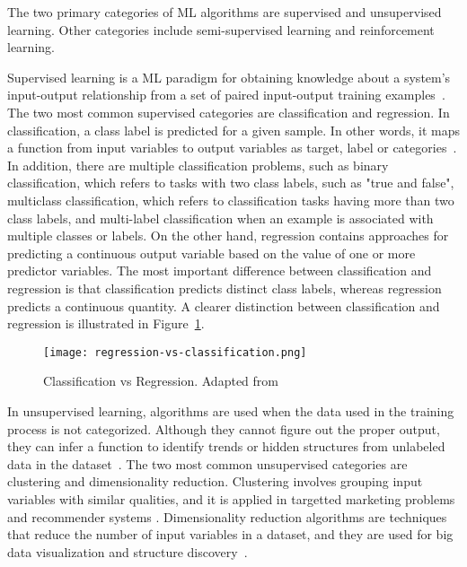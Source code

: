 \begin{enumerate}
    The two primary categories of \gls{ML} algorithms are supervised and unsupervised learning. Other categories include semi-supervised learning and reinforcement learning.
    
    Supervised learning is a \gls{ML} paradigm for obtaining knowledge about a system's input-output relationship from a set of paired input-output training examples~\cite{Liu2012SupervisedLearning}. The two most common supervised categories are classification and regression. In classification, a class label is predicted for a given sample. In other words, it maps a function from input variables to output variables as target, label or categories~\cite{Sarker2021MachineDirections}.
    In addition, there are multiple classification problems, such as binary classification, which refers to tasks with two class labels, such as "true and false", multiclass classification, which refers to classification tasks having more than two class labels, and multi-label classification when an example is associated with multiple classes or labels. On the other hand, regression contains approaches for predicting a continuous output variable based on the value of one or more predictor variables. The most important difference between classification and regression is that classification predicts distinct class labels, whereas regression predicts a continuous quantity. A clearer distinction between classification and regression is illustrated in Figure~\ref{fig:regression_vs_classification}.
        
    \begin{figure}[htbp]
        \centering
        \texttt{[image: regression-vs-classification.png]}
        \caption{Classification vs Regression. Adapted from~\cite{Matanga2017AnalysisInterfaces}}
        \label{fig:regression_vs_classification}
    \end{figure}
    
    In unsupervised learning, algorithms are used when the data used in the training process is not categorized. Although they cannot figure out the proper output, they can infer a function to identify trends or hidden structures from unlabeled data in the dataset~\cite{Karazi2019StatisticalProcess-Review}. The two most common unsupervised categories are clustering and dimensionality reduction. Clustering involves grouping input variables with similar qualities, and it is applied in targetted marketing problems and recommender systems \cite{Omran2007AnMethods}. Dimensionality reduction algorithms are techniques that reduce the number of input variables in a dataset, and they are used for big data visualization and structure discovery~\cite{VanDerMaaten2009DimensionalityComparative}. 
    

\end{enumerate}
